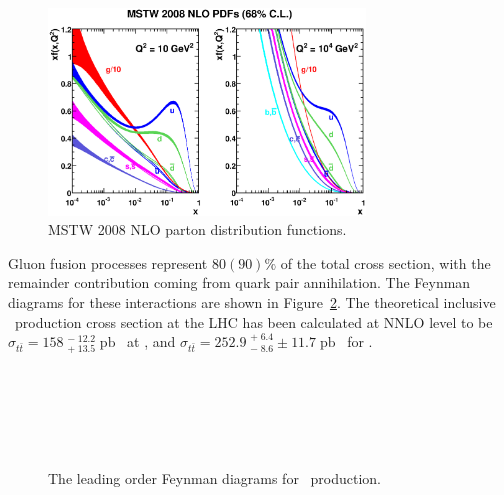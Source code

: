 \begin{figure}[htbp]
  \centering
    \includegraphics[width=0.75\textwidth]{PartTopQuark/Plots/mstw2008nlo68cl_allpdfs.eps}
    \caption{MSTW 2008 NLO parton distribution functions.}\label{fig:TopMSTWNLOPDFs}
\end{figure}

Gluon fusion processes represent $\num{80}(\num{90})\si{\percent}$ of the total cross section, with the remainder contribution coming from quark pair annihilation. The Feynman diagrams for these interactions are shown in Figure~\ref{fig:TopQuarkProduction}. The theoretical inclusive \ttbar\ production cross section at the LHC has been calculated at NNLO level to be $\sigma_{t\bar{t}}=158\;^{-\;12.2}_{+\;13.5}\;\si{\pico\barn}$~\cite{TopPair} at \cmsS, and $\sigma_{t\bar{t}}=252.9\;^{+\;6.4}_{-\;8.6}\pm11.7\;\si{\pico\barn}$~\cite{TopQuark:CrossSection8TeV} for \cmsE.
%
\begin{figure}[htbp]
  \centering
  \begin{minipage}[][][t]{.47\textwidth}
    \centering
    
  \end{minipage}
  \,
  \begin{minipage}[][][t]{.47\textwidth}
    \centering
    
  \end{minipage}
  
  \begin{minipage}[][][t]{.47\textwidth}
    \centering
    
  \end{minipage}
  \,
  \begin{minipage}[][][t]{.47\textwidth}
    \centering
    
  \end{minipage}
  \,
  \caption{The leading order Feynman diagrams for \ttbar\ production.}\label{fig:TopQuarkProduction}
\end{figure}


